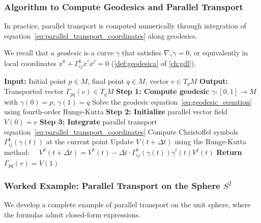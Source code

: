 \subsubsection{Algorithm to Compute Geodesics and Parallel Transport}

In practice, parallel transport is computed numerically through integration of equation~\eqref{eq:parallel_transport_coordinates} along geodesics.

We recall that a \textit{geodesic} is a curve $\gamma$ that satisfies $\nabla_{\dot{\gamma}} \dot{\gamma} = 0$, or equivalently in local coordinates $\ddot{x}^k + \Gamma^k_{ij} \dot{x}^i \dot{x}^j = 0$ (\autoref{def:geodesica} of \autoref{ch:gdl}).\label{def:geodesic_attention}\label{eq:geodesic_equation}

\begin{algorithm}[H]
\caption{Computation of Parallel Transport on Riemannian Manifolds}
\label{alg:parallel_transport_computation}
\begin{algorithmic}[1]
    \State \textbf{Input:} Initial point $p \in M$, final point $q \in M$, vector $v \in T_p M$
    \State \textbf{Output:} Transported vector $\Gamma_{pq}(v) \in T_q M$
    \State
    \State \textbf{Step 1: Compute geodesic} $\gamma: [0,1] \to M$ with $\gamma(0) = p$, $\gamma(1) = q$
    \State Solve the geodesic equation~\eqref{eq:geodesic_equation} using fourth-order Runge-Kutta
    \State
    \State \textbf{Step 2: Initialize} parallel vector field $V(0) = v$
    \State
    \State \textbf{Step 3: Integrate} parallel transport equation~\eqref{eq:parallel_transport_coordinates}
        \State Compute Christoffel symbols $\Gamma^k_{ij}(\gamma(t))$ at the current point
        \State Update $V(t + \Delta t)$ using the Runge-Kutta method:
        \State $\quad V^k(t + \Delta t) = V^k(t) - \Delta t \cdot \Gamma^k_{ij}(\gamma(t)) \dot{\gamma}^i(t) V^j(t)$
    \EndFor
    \State
    \State \textbf{Return} $\Gamma_{pq}(v) = V(1)$
\end{algorithmic}
\end{algorithm}

\subsubsection{Worked Example: Parallel Transport on the Sphere $S^2$}

We develop a complete example of parallel transport on the unit sphere, where the formulas admit closed-form expressions.

